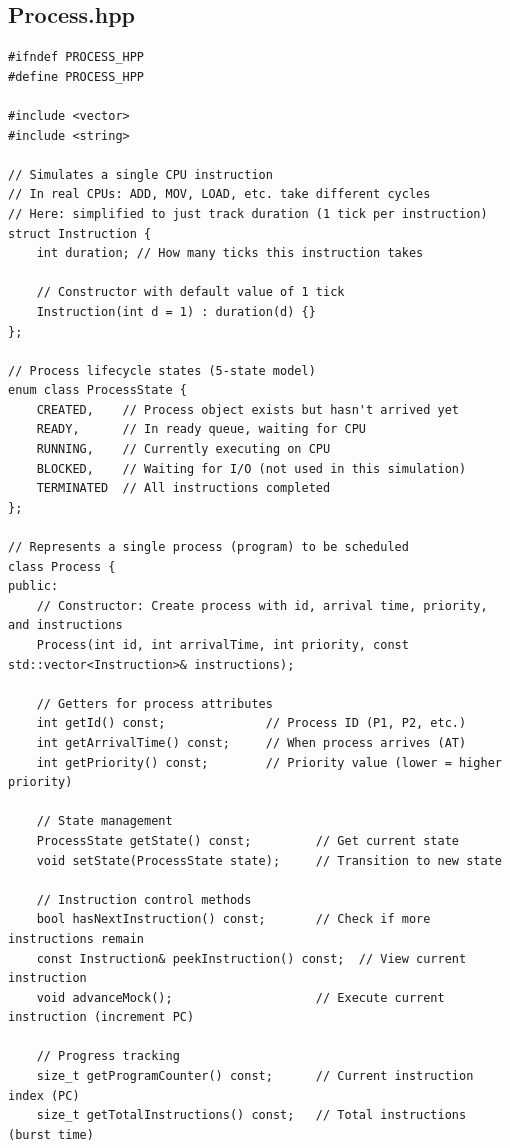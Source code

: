 \documentclass[a4paper,10pt,oneside]{article}
\begin{document}
\begin{multicols*}{\COLS}
\newpage
{}

\section*{Process.hpp}
\begin{lstlisting}
#ifndef PROCESS_HPP
#define PROCESS_HPP

#include <vector>
#include <string>

// Simulates a single CPU instruction
// In real CPUs: ADD, MOV, LOAD, etc. take different cycles
// Here: simplified to just track duration (1 tick per instruction)
struct Instruction {
    int duration; // How many ticks this instruction takes
    
    // Constructor with default value of 1 tick
    Instruction(int d = 1) : duration(d) {}
};

// Process lifecycle states (5-state model)
enum class ProcessState {
    CREATED,    // Process object exists but hasn't arrived yet
    READY,      // In ready queue, waiting for CPU
    RUNNING,    // Currently executing on CPU
    BLOCKED,    // Waiting for I/O (not used in this simulation)
    TERMINATED  // All instructions completed
};

// Represents a single process (program) to be scheduled
class Process {
public:
    // Constructor: Create process with id, arrival time, priority, and instructions
    Process(int id, int arrivalTime, int priority, const std::vector<Instruction>& instructions);

    // Getters for process attributes
    int getId() const;              // Process ID (P1, P2, etc.)
    int getArrivalTime() const;     // When process arrives (AT)
    int getPriority() const;        // Priority value (lower = higher priority)
    
    // State management
    ProcessState getState() const;         // Get current state
    void setState(ProcessState state);     // Transition to new state

    // Instruction control methods
    bool hasNextInstruction() const;       // Check if more instructions remain
    const Instruction& peekInstruction() const;  // View current instruction
    void advanceMock();                    // Execute current instruction (increment PC)

    // Progress tracking
    size_t getProgramCounter() const;      // Current instruction index (PC)
    size_t getTotalInstructions() const;   // Total instructions (burst time)


\end{lstlisting}
\end{multicols*}
\end{document}
